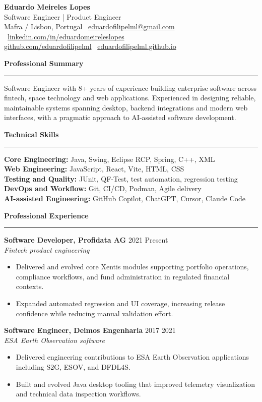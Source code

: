 \documentclass[9pt,a4paper]{extarticle}
\newcommand{\sectiontitle}[1]{%
  \vspace{3pt}
  {\small\bfseries\color{heading}#1}\par
  \rule{\linewidth}{0.35pt}\vspace{1pt}
}
\newcommand{\roleheader}[3]{%
  {\bfseries #1} \hfill {\color{textsoft}#2}\\[-1pt]
  {\itshape #3\/}\\[-2pt]
}
\begin{document}
{\Large\bfseries Eduardo Meireles Lopes}\\[-1pt]
{\normalsize Software Engineer | Product Engineer}\\[-1pt]
Mafra / Lisbon, Portugal \textbar\ \href{mailto:eduardofilipelml@gmail.com}{eduardofilipelml@gmail.com} \textbar\ \href{https://www.linkedin.com/in/eduardomeireleslopes/}{linkedin.com/in/eduardomeireleslopes}\\
\href{https://github.com/eduardofilipelml}{github.com/eduardofilipelml} \textbar\ \href{https://eduardofilipelml.github.io/}{eduardofilipelml.github.io}

\sectiontitle{Professional Summary}
Software Engineer with 8+ years of experience building enterprise software across fintech, space technology and web applications. Experienced in designing reliable, maintainable systems spanning desktop, backend integrations and modern web interfaces, with a pragmatic approach to AI-assisted software development.

\sectiontitle{Technical Skills}
\textbf{Core Engineering:} Java, Swing, Eclipse RCP, Spring, C++, XML\\
\textbf{Web Engineering:} JavaScript, React, Vite, HTML, CSS\\
\textbf{Testing and Quality:} JUnit, QF-Test, test automation, regression testing\\
\textbf{DevOps and Workflow:} Git, CI/CD, Podman, Agile delivery\\
\textbf{AI-assisted Engineering:} GitHub Copilot, ChatGPT, Cursor, Claude Code

\sectiontitle{Professional Experience}
\roleheader{Software Developer, Profidata AG}{2021 \textendash{} Present}{Fintech product engineering}
\begin{itemize}
  \item Delivered and evolved core Xentis modules supporting portfolio operations, compliance workflows, and fund administration in regulated financial contexts.
  \item Expanded automated regression and UI coverage, increasing release confidence while reducing manual validation effort.
\end{itemize}

\roleheader{Software Engineer, Deimos Engenharia}{2017 \textendash{} 2021}{ESA Earth Observation software}
\begin{itemize}
  \item Delivered engineering contributions to ESA Earth Observation applications including S2G, ESOV, and DFDL4S.
  \item Built and evolved Java desktop tooling that improved telemetry visualization and technical data inspection workflows.
\end{itemize}
\end{document}
